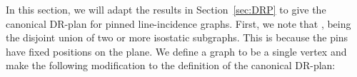 
In this section, we will adapt the results in Section~\ref{sec:DRP} to give the canonical DR-plan for pinned line-incidence graphs. First, we note that
, being the disjoint union of two or more isostatic subgraphs. This is because the pins have fixed positions on the plane.
%
%
%
%
%
%
%
We define a  graph to be a single vertex and make the following modification to the definition of the canonical DR-plan:


